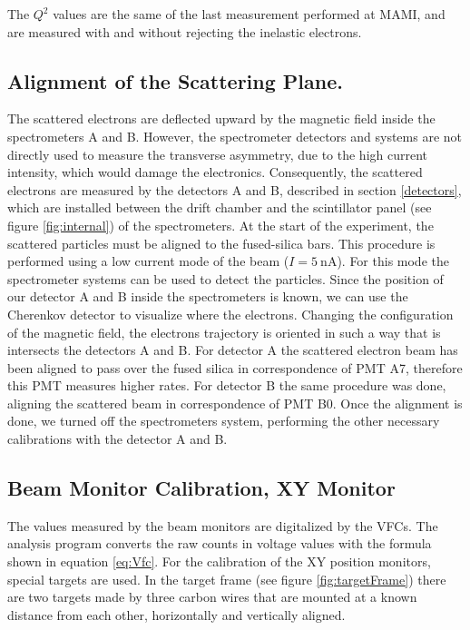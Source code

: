 The $Q^{2}$ values are the same of the last measurement performed at MAMI, and are measured with and without rejecting the inelastic electrons. 

\subsection{Alignment of the Scattering Plane.}

The scattered electrons are deflected upward by the magnetic field inside the spectrometers A and B. However, the spectrometer detectors and systems are not directly used to measure the transverse asymmetry, due to the high current intensity, which would damage the electronics.
Consequently, the scattered electrons are measured by the detectors A and B, described in section \ref{detectors}, which are installed between the drift chamber and the scintillator panel (see figure \ref{fig:internal}) of the spectrometers. At the start of the experiment, the scattered particles must be aligned to the fused-silica bars.
This procedure is performed using a low current mode of the beam ($I = \SI{5}{\nano \ampere}$). For this mode the spectrometer systems can be used to detect the particles. Since the position of our detector A and B  inside the spectrometers is known, we can use the Cherenkov detector to visualize where the electrons. Changing the configuration of the magnetic field, the electrons trajectory is oriented in such a way that is intersects the detectors A and B. For detector A the scattered electron beam has been aligned to pass over the fused silica in correspondence of PMT A7, therefore this PMT measures higher rates. For detector B the same procedure was done, aligning the scattered beam in correspondence of PMT B0. Once the alignment is done, we turned off the spectrometers system, performing the other necessary calibrations with the detector A and B. 

\subsection{Beam Monitor Calibration, XY Monitor} \label{XYpos}

The values measured by the beam monitors are digitalized by the VFCs. The analysis program converts the raw counts in voltage values with the formula shown in equation \ref{eq:Vfc}. For the calibration of the XY position monitors, special targets are used. In the target frame (see figure \ref{fig:targetFrame}) there are two targets made by three carbon wires that are mounted at a known distance from each other, horizontally and vertically aligned. 

